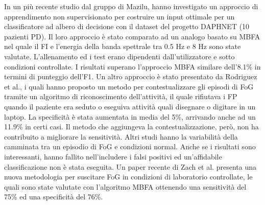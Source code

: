 In un più recente studio dal gruppo di Mazilu, hanno investigato un approccio di apprendimento non supervisionato per costruire un input ottimale per un classificatore ad albero di decisione con il dataset del progetto DAPHNET (10 pazienti PD). Il loro approccio è stato comparato ad un analogo basato su MBFA nel quale il FI e l'energia della banda spettrale tra 0.5 Hz e 8 Hz sono state valutate. L'allenamento ed i test erano dipendenti dall'utilizzatore e sotto condizioni controllate. I risultati superano l'approccio MBFA similare dell'8.1\% in termini di punteggio dell'F1. Un altro approccio è stato presentato da Rodriguez et al., i quali hanno proposto un metodo per contestualizzare gli episodi di FoG tramite un algoritmo di riconoscimento dell'attività, il quale rifiutava i FP quando il paziente era seduto o eseguiva attività quali disegnare o digitare in un laptop. La specificità è stata aumentata in media del 5\%, arrivando anche ad un 11.9\% in certi casi\cite{50}. Il metodo che aggiungeva la contestualizzazione, però, non ha contribuito a migliorare la sensitività. Altri studi hanno la variabilità della camminata tra un episodio di FoG e condizioni normal. Anche se i risultati sono interessanti, hanno fallito nell'includere i falsi positivi ed un'affidabile classificazione non è stata eseguita\cite{53,54}. Un paper recente di Zach et al. presenta una nuova metodologia per suscitare FoG in condizioni di laboratorio controllate, le quali sono state valutate con l'algoritmo MBFA ottenendo una sensitività del 75\% ed una specificità del 76\%\cite{31}. \newline
